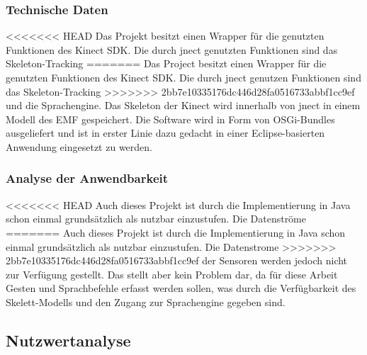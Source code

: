 
\subsubsection{Technische Daten}

<<<<<<< HEAD
Das Projekt besitzt einen Wrapper f\"ur die genutzten Funktionen des Kinect SDK. Die durch jnect genutzten Funktionen sind das Skeleton-Tracking 
=======
Das Project besitzt einen Wrapper f\"ur die genutzten Funktionen des Kinect SDK. Die durch jnect genutzen Funktionen sind das Skeleton-Tracking 
>>>>>>> 2bb7e10335176dc446d28fa0516733abbf1cc9ef
und die Sprachengine. Das Skeleton der Kinect wird innerhalb von jnect in einem Modell des \gls{EMF} gespeichert. Die Software wird in Form von OSGi-Bundles ausgeliefert 
und ist in erster Linie dazu gedacht in einer Eclipse-basierten Anwendung eingesetzt zu werden.

\subsubsection{Analyse der Anwendbarkeit}

<<<<<<< HEAD
Auch dieses Projekt ist durch die Implementierung in Java schon einmal grunds\"atzlich als nutzbar einzustufen. Die Datenstr\"ome 
=======
Auch dieses Projekt ist durch die Implementierung in Java schon einmal grunds\"atzlich als nutzbar einzustufen. Die Datenstrome 
>>>>>>> 2bb7e10335176dc446d28fa0516733abbf1cc9ef
der Sensoren werden jedoch nicht zur Verf\"ugung gestellt. Das stellt aber kein Problem dar, da f\"ur diese Arbeit Gesten und Sprachbefehle 
erfasst werden sollen, was durch die Verf\"ugbarkeit des Skelett-Modells und den Zugang zur Sprachengine gegeben sind.

\subsection{Nutzwertanalyse}

